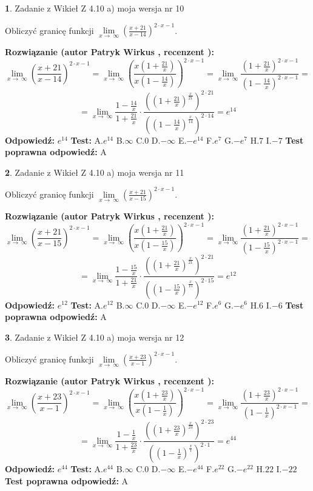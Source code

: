 \documentclass[12pt, a4paper]{article}
\theoremstyle{definition} %
\newtheorem{zad}{}
\newcommand{\zadStart}[1]{\begin{zad}#1\newline}
\newcommand{\zadStop}{\end{zad}}
\newcommand{\rozwStart}[2]{\noindent \textbf{Rozwiązanie (autor #1 , recenzent #2): }\newline}
\newcommand{\rozwStop}{\newline}
\newcommand{\odpStart}{\noindent \textbf{Odpowiedź:}\newline}
\newcommand{\odpStop}{\newline}
\newcommand{\testStart}{\noindent \textbf{Test:}\newline}
\newcommand{\testStop}{\newline}
\newcommand{\kluczStart}{\noindent \textbf{Test poprawna odpowiedź:}\newline}
\newcommand{\kluczStop}{\newline}
\begin{document}
\zadStart{Zadanie z Wikieł Z 4.10 a) moja wersja nr 10}

Obliczyć granicę funkcji  $\lim\limits_{x\to\ \infty}(\frac{x+21}{x-14})^{2\cdot x-1}$.
\zadStop
\rozwStart{Patryk Wirkus}{}
$$\lim\limits_{x\to\ \infty}(\frac{x+21}{x-14})^{2\cdot x-1} = \lim\limits_{x\to\ \infty}(\frac{x(1+\frac{21}{x})}{x(1-\frac{14}{x})})^{2\cdot x-1}=\lim\limits_{x\to\ \infty}\frac{(1+\frac{21}{x})^{2\cdot x-1}}{(1-\frac{14}{x})^{2\cdot x-1}}=$$
$$=\lim\limits_{x\to\ \infty}\frac{1-\frac{14}{x}}{1+\frac{21}{x}}\cdot\frac{((1+\frac{21}{x})^{\frac{x}{21}})^{2\cdot21}}{((1-\frac{14}{x})^{\frac{x}{14}})^{2\cdot14}}=e^{14}$$
\rozwStop
\odpStart
$e^{14}$
\odpStop
\testStart
A.$e^{14}$ B.$\infty$ C.$0$ D.$-\infty$ E.$-e^{14}$
F.$e^{7}$ G.$-e^{7}$
H.$7$
I.$-7$
\testStop
\kluczStart
A
\kluczStop



\zadStart{Zadanie z Wikieł Z 4.10 a) moja wersja nr 11}

Obliczyć granicę funkcji  $\lim\limits_{x\to\ \infty}(\frac{x+21}{x-15})^{2\cdot x-1}$.
\zadStop
\rozwStart{Patryk Wirkus}{}
$$\lim\limits_{x\to\ \infty}(\frac{x+21}{x-15})^{2\cdot x-1} = \lim\limits_{x\to\ \infty}(\frac{x(1+\frac{21}{x})}{x(1-\frac{15}{x})})^{2\cdot x-1}=\lim\limits_{x\to\ \infty}\frac{(1+\frac{21}{x})^{2\cdot x-1}}{(1-\frac{15}{x})^{2\cdot x-1}}=$$
$$=\lim\limits_{x\to\ \infty}\frac{1-\frac{15}{x}}{1+\frac{21}{x}}\cdot\frac{((1+\frac{21}{x})^{\frac{x}{21}})^{2\cdot21}}{((1-\frac{15}{x})^{\frac{x}{15}})^{2\cdot15}}=e^{12}$$
\rozwStop
\odpStart
$e^{12}$
\odpStop
\testStart
A.$e^{12}$ B.$\infty$ C.$0$ D.$-\infty$ E.$-e^{12}$
F.$e^{6}$ G.$-e^{6}$
H.$6$
I.$-6$
\testStop
\kluczStart
A
\kluczStop



\zadStart{Zadanie z Wikieł Z 4.10 a) moja wersja nr 12}

Obliczyć granicę funkcji  $\lim\limits_{x\to\ \infty}(\frac{x+23}{x-1})^{2\cdot x-1}$.
\zadStop
\rozwStart{Patryk Wirkus}{}
$$\lim\limits_{x\to\ \infty}(\frac{x+23}{x-1})^{2\cdot x-1} = \lim\limits_{x\to\ \infty}(\frac{x(1+\frac{23}{x})}{x(1-\frac{1}{x})})^{2\cdot x-1}=\lim\limits_{x\to\ \infty}\frac{(1+\frac{23}{x})^{2\cdot x-1}}{(1-\frac{1}{x})^{2\cdot x-1}}=$$
$$=\lim\limits_{x\to\ \infty}\frac{1-\frac{1}{x}}{1+\frac{23}{x}}\cdot\frac{((1+\frac{23}{x})^{\frac{x}{23}})^{2\cdot23}}{((1-\frac{1}{x})^{\frac{x}{1}})^{2\cdot1}}=e^{44}$$
\rozwStop
\odpStart
$e^{44}$
\odpStop
\testStart
A.$e^{44}$ B.$\infty$ C.$0$ D.$-\infty$ E.$-e^{44}$
F.$e^{22}$ G.$-e^{22}$
H.$22$
I.$-22$
\testStop
\kluczStart
A
\kluczStop
\end{document}

